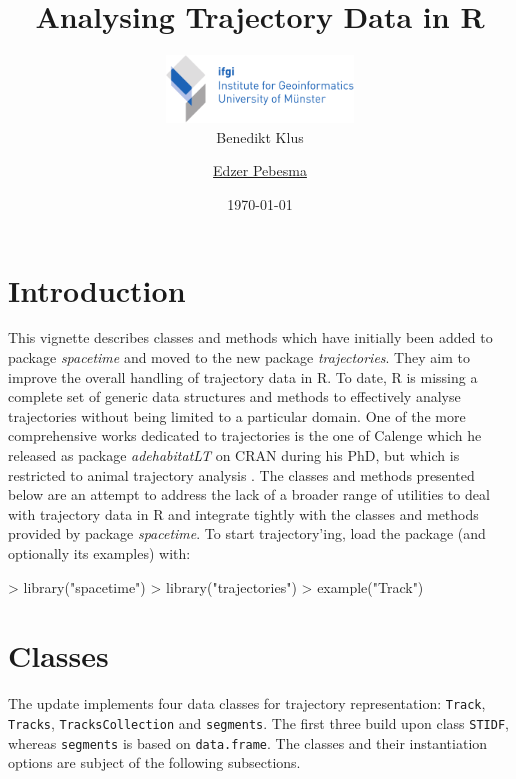 \documentclass{article}
\title{Analysing Trajectory Data in R}
\author{
\includegraphics[width=5cm]{ifgi-logo_int} \\ %
Benedikt Klus \and
\href{mailto:edzer.pebesma@uni-muenster.de}{Edzer Pebesma}
}
\date{\today}
\newcommand{\code}[1]{{\tt #1}}
\begin{document}


\maketitle

\tableofcontents

\newpage

\section{Introduction}

This vignette describes classes and methods which have initially been added to package \emph{spacetime} \cite{pebesma12, bivand13} and moved to the new package \emph{trajectories}. They aim to improve the overall handling of trajectory data in R. To date, R is missing a complete set of generic data structures and methods to effectively analyse trajectories without being limited to a particular domain. One of the more comprehensive works dedicated to trajectories is the one of Calenge which he released as package \emph{adehabitatLT} on CRAN during his PhD, but which is restricted to animal trajectory analysis \cite{calenge06}. The classes and methods presented below are an attempt to address the lack of a broader range of utilities to deal with trajectory data in R and integrate tightly with the classes and methods provided by package \emph{spacetime}. To start trajectory'ing, load the package (and optionally its examples) with:

\begin{Schunk}
\begin{Sinput}
> library("spacetime")
> library("trajectories")
> example("Track")
\end{Sinput}
\end{Schunk}

\section{Classes}

The update implements four data classes for trajectory representation: \code{Track}, \code{Tracks}, \code{TracksCollection} and \code{segments}. The first three build upon class \code{STIDF}, whereas \code{segments} is based on \code{data.frame}. The classes and their instantiation options are subject of the following subsections.
\end{document}
